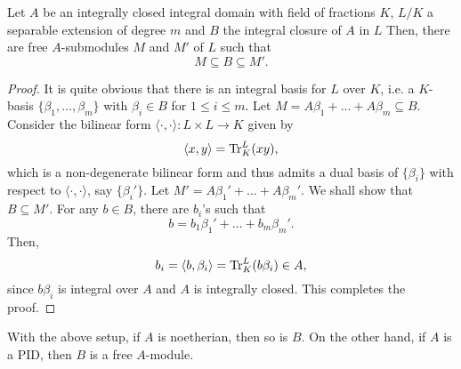 \begin{theorem}
    Let $A$ be an integrally closed integral domain with field of fractions $K$, $L/K$ a separable extension of degree $m$ and $B$ the integral closure of $A$ in $L$ Then, there are free $A$-submodules $M$ and $M'$ of $L$ such that 
    \begin{equation*}
        M\subseteq B\subseteq M'.
    \end{equation*}
\end{theorem}
\begin{proof}
    It is quite obvious that there is an integral basis for $L$ over $K$, i.e. a $K$-basis $\{\beta_1,\dots,\beta_m\}$ with $\beta_i\in B$ for $1\le i\le m$. Let $M = A\beta_1 + \dots + A\beta_m\subseteq B$. Consider the bilinear form $\langle\cdot,\cdot\rangle: L\times L\to K$ given by 
    \begin{equation*}
        \langle x,y\rangle = \operatorname{Tr}^L_K(xy),
    \end{equation*}
    which is a non-degenerate bilinear form and thus admits a dual basis of $\{\beta_i\}$ with respect to $\langle\cdot,\cdot\rangle$, say $\{\beta_i'\}$. Let $M' = A\beta_1' + \dots + A\beta_m'$. We shall show that $B\subseteq M'$. For any $b\in B$, there are $b_i$'s such that 
    \begin{equation}
        b = b_1\beta_1' + \dots + b_m\beta_m'.
    \end{equation}
    Then, 
    \begin{equation*}
        b_i = \langle b, \beta_i\rangle = \operatorname{Tr}^L_K(b\beta_i)\in A,
    \end{equation*}
    since $b\beta_i$ is integral over $A$ and $A$ is integrally closed. This completes the proof.
\end{proof}

\begin{corollary}
    With the above setup, if $A$ is noetherian, then so is $B$. On the other hand, if $A$ is a PID, then $B$ is a free $A$-module.
\end{corollary}

